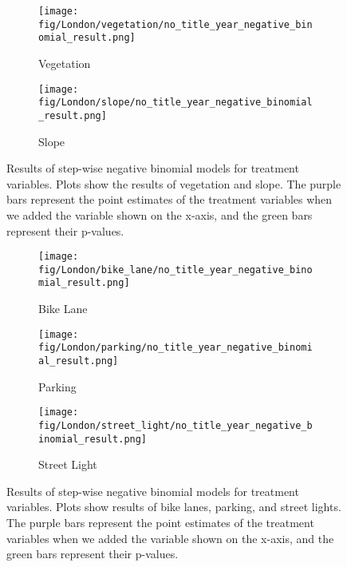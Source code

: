 \documentclass[preprint,12pt, authoryear]{elsarticle}
\begin{document}
\begin{figure}
    \centering
    \begin{subfigure}{0.7\textwidth}
        \centering
        \texttt{[image: fig/London/vegetation/no\_title\_year\_negative\_binomial\_result.png]}
        \caption{Vegetation}
    \end{subfigure}
    
    \vspace{1cm} %
    
    \begin{subfigure}{0.7\textwidth}
        \centering
        \texttt{[image: fig/London/slope/no\_title\_year\_negative\_binomial\_result.png]}
        \caption{Slope}
    \end{subfigure}
    \caption{Results of step-wise negative binomial models for treatment variables. Plots show the results of vegetation and slope. The purple bars represent the point estimates of the treatment variables when we added the variable shown on the x-axis, and the green bars represent their p-values.}
    \label{result:fig:step_model_part1}
\end{figure}

\begin{figure}
    \centering
    \begin{subfigure}{0.7\textwidth}
        \centering
        \texttt{[image: fig/London/bike\_lane/no\_title\_year\_negative\_binomial\_result.png]}
        \caption{Bike Lane}
    \end{subfigure}
    
    \vspace{1cm} %
    
    \begin{subfigure}{0.7\textwidth}
        \centering
        \texttt{[image: fig/London/parking/no\_title\_year\_negative\_binomial\_result.png]}
        \caption{Parking}
    \end{subfigure}
    
    \vspace{1cm} %
    
    \begin{subfigure}{0.7\textwidth}
        \centering
        \texttt{[image: fig/London/street\_light/no\_title\_year\_negative\_binomial\_result.png]}
        \caption{Street Light}
    \end{subfigure}
    
    \caption{Results of step-wise negative binomial models for treatment variables. Plots show results of bike lanes, parking, and street lights. The purple bars represent the point estimates of the treatment variables when we added the variable shown on the x-axis, and the green bars represent their p-values.}
    \label{result:fig:step_model_part2}
\end{figure}
\end{document}
